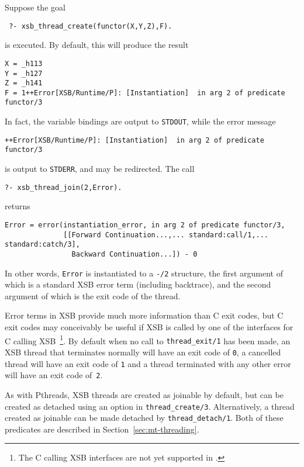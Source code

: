 \begin{example}
Suppose the goal 
\begin{verbatim}
 ?- xsb_thread_create(functor(X,Y,Z),F).
\end{verbatim}
%
is executed.  By default, this will produce the result
%
\begin{verbatim}
X = _h113
Y = _h127
Z = _h141
F = 1++Error[XSB/Runtime/P]: [Instantiation]  in arg 2 of predicate functor/3
\end{verbatim}
%
In fact, the variable bindings are output to {\tt STDOUT}, while the
error message
%
\begin{verbatim}
++Error[XSB/Runtime/P]: [Instantiation]  in arg 2 of predicate functor/3
\end{verbatim}
%
is output to {\tt STDERR}, and may be redirected.  The call
%
\begin{verbatim}
?- xsb_thread_join(2,Error).
\end{verbatim}
%
returns
%
\begin{verbatim}
Error = error(instantiation_error, in arg 2 of predicate functor/3,
              [[Forward Continuation...,... standard:call/1,... standard:catch/3],
                Backward Continuation...]) - 0
\end{verbatim}
%
In other words, {\tt Error} is instantiated to a {\tt -/2} structure,
the first argument of which is a standard XSB error term (including
backtrace), and the second argument of which is the exit code of the
thread.
\end{example}
%
Error terms in XSB provide much more information than C exit codes,
but C exit codes may conceivably be useful if XSB is called by one of
the interfaces for C calling XSB~\footnote{The C calling XSB
  interfaces are not yet supported in \version.}.  By default when no
call to {\tt thread\_exit/1} has been made, an XSB thread that
terminates normally will have an exit code of {\tt 0}, a cancelled
thread will have an exit code of {\tt 1} and a thread terminated with
any other error will have an exit code of~{\tt 2}.

As with Pthreads, XSB threads are created as joinable by default, but
can be created as detached using an option in {\tt thread\_create/3}.
Alternatively, a thread created as joinable can be made detached by
{\tt thread\_detach/1}.  Both of these predicates are described in
Section~\ref{sec:mt-threading}.

